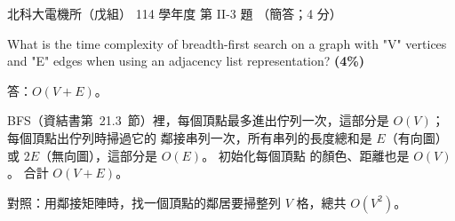 \begin{pastexam}[label={px:ntut-114-ee-ds-07}]{北科大電機所（戊組） 114 學年度 第 II-3 題}
（簡答；4 分）

What is the time complexity of breadth-first search on a graph with "V" vertices and "E" edges when
using an adjacency list representation? \textbf{(4\%)}
\end{pastexam}

\begin{pastsoln}
答：$O(V + E)$。

BFS（資結書第~21.3~節）裡，每個頂點最多進出佇列一次，這部分是 $O(V)$；每個頂點出佇列時掃過它的
鄰接串列一次，所有串列的長度總和是 $E$（有向圖）或 $2E$（無向圖），這部分是 $O(E)$。 初始化每個頂點
的顏色、距離也是 $O(V)$。 合計 $O(V + E)$。

對照：用鄰接矩陣時，找一個頂點的鄰居要掃整列 $V$ 格，總共 $O(V^2)$。
\end{pastsoln}
